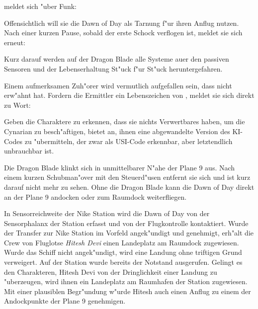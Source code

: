 \xl{} meldet sich "uber Funk:


Offensichtlich will sie die Dawn of Day als Tarnung f"ur ihren Anflug nutzen. Nach einer kurzen Pause, sobald der erste Schock verflogen ist, meldet sie sich erneut:


Kurz darauf werden auf der Dragon Blade alle Systeme au\3er den passiven Sensoren und der Lebenserhaltung St"uck f"ur St"uck heruntergefahren.

Einem aufmerksamen Zuh"orer wird vermutlich aufgefallen sein, dass \xl{} \ml{} nicht erw"ahnt hat. Fordern die Ermittler ein Lebenszeichen von \ml{}, meldet sie sich direkt zu Wort:


Geben die Charaktere zu erkennen, dass sie nichts Verwertbares haben, um die Cynarian zu besch"aftigen, bietet \ml{} an, ihnen eine abgewandelte Version des KI-Codes zu "ubermitteln, der zwar als USI-Code erkennbar, aber letztendlich unbrauchbar ist.

Die Dragon Blade klinkt sich in unmittelbarer N"ahe der Plane 9 aus. Nach einem kurzen Schubman"over mit den Steuerd"usen entfernt sie sich und ist kurz darauf nicht mehr zu sehen. Ohne die Dragon Blade kann die Dawn of Day direkt an der Plane 9 andocken oder zum Raumdock weiterfliegen.

In Sensorreichweite der Nike Station wird die Dawn of Day von der Sensorphalanx der Station erfasst und von der Flugkontrolle kontaktiert. Wurde der Transfer zur Nike Station im Vorfeld angek"undigt und genehmigt, erh"alt die Crew von Fluglotse \emph{Hitesh Devi} einen Landeplatz am Raumdock zugewiesen. Wurde das Schiff nicht angek"undigt, wird eine Landung ohne triftigen Grund verweigert. Auf der Station wurde bereits der Notstand ausgerufen. Gelingt es den Charakteren, Hitesh Devi von der Dringlichkeit einer Landung zu "uberzeugen, wird ihnen ein Landeplatz am Raumhafen der Station zugewiesen. Mit einer plausiblen Begr"undung w"urde Hitesh auch einen Anflug zu einem der Andockpunkte der Plane 9 genehmigen.

